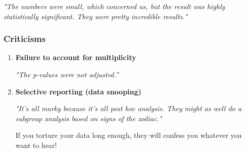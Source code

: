 \documentclass[xcolor={pdftex,dvipsnames,table}]{beamer}
\begin{document}
\begin{frame}
\bigskip

\emph{"The numbers were small, which concerned us, but the result was highly statistically significant. They were pretty incredible results."}

\end{frame}

\begin{frame}
\frametitle{Criticisms}

\begin{enumerate}
\item \textcolor{cambridgedarkorange}{\textbf{Failure to account for multiplicity}}

\bigskip 

\emph{"The p-values were not adjusted.''}
% 
% 
% 


\bigskip 

\item \textcolor{cambridgedarkorange}{\textbf{Selective reporting (data snooping)}}

\bigskip 

\emph{"It's all murky because it's all post hoc analysis. They might as well do a subgroup analysis based on signs of the zodiac."}

\bigskip

If you torture your data long enough, they will confess you whatever you want to hear!
\end{enumerate}

\end{frame}
\end{document}
